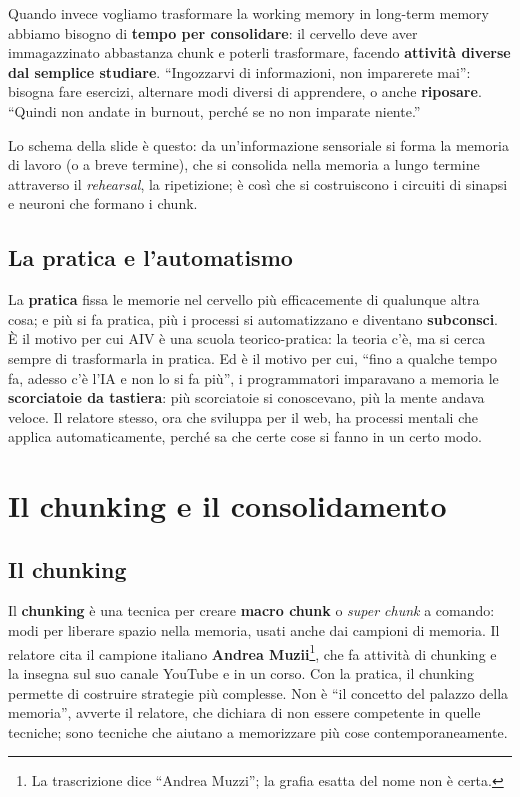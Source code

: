 Quando invece vogliamo trasformare la working memory in long-term memory
abbiamo bisogno di \textbf{tempo per consolidare}: il cervello deve aver
immagazzinato abbastanza chunk e poterli trasformare, facendo
\textbf{attività diverse dal semplice studiare}. ``Ingozzarvi di
informazioni, non imparerete mai'': bisogna fare esercizi, alternare modi
diversi di apprendere, o anche \textbf{riposare}. ``Quindi non andate in
burnout, perché se no non imparate niente.''

Lo schema della slide è questo: da un'informazione sensoriale si forma la
memoria di lavoro (o a breve termine), che si consolida nella memoria a
lungo termine attraverso il \emph{rehearsal}, la ripetizione; è così che
si costruiscono i circuiti di sinapsi e neuroni che formano i chunk.

\subsection{La pratica e l'automatismo}

La \textbf{pratica} fissa le memorie nel cervello più efficacemente di
qualunque altra cosa; e più si fa pratica, più i processi si automatizzano
e diventano \textbf{subconsci}. È il motivo per cui AIV è una scuola
teorico-pratica: la teoria c'è, ma si cerca sempre di trasformarla in
pratica. Ed è il motivo per cui, ``fino a qualche tempo fa, adesso c'è l'IA
e non lo si fa più'', i programmatori imparavano a memoria le
\textbf{scorciatoie da tastiera}: più scorciatoie si conoscevano, più la
mente andava veloce. Il relatore stesso, ora che sviluppa per il web, ha
processi mentali che applica automaticamente, perché sa che certe cose si
fanno in un certo modo.

\section{Il chunking e il consolidamento}
\label{p0:sec:chunking}

\subsection{Il chunking}

Il \textbf{chunking} è una tecnica per creare \textbf{macro chunk} o
\emph{super chunk} a comando: modi per liberare spazio nella memoria, usati
anche dai campioni di memoria. Il relatore cita il campione italiano
\textbf{Andrea Muzii}\footnote{La trascrizione dice ``Andrea Muzzi''; la
grafia esatta del nome non è certa.}, che fa attività di chunking e la
insegna sul suo canale YouTube e in un corso. Con la pratica, il chunking
permette di costruire strategie più complesse. Non è ``il concetto del
palazzo della memoria'', avverte il relatore, che dichiara di non essere
competente in quelle tecniche; sono tecniche che aiutano a memorizzare più
cose contemporaneamente.

